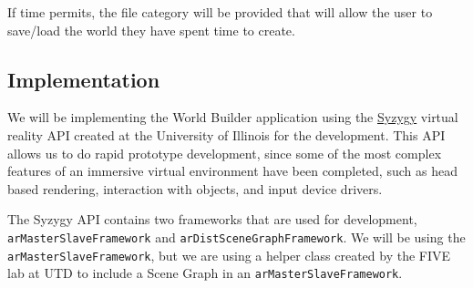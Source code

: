 If time permits, the file category will be provided that will allow the user to save/load the world they have spent time to create.

\subsection{Implementation}
We will be implementing the World Builder application using the \href{http://syzygy.isl.uiuc.edu/szg/szgsrc/doc/index.html}{Syzygy} virtual reality API created at the University of Illinois for the development.
This API allows us to do rapid prototype development, since some of the most complex features of an immersive virtual environment have been completed, such as head based rendering, interaction with objects, and input device drivers.

The Syzygy API contains two frameworks that are used for development, \verb|arMasterSlaveFramework| and \verb|arDistSceneGraphFramework|.
We will be using the \verb|arMasterSlaveFramework|, but we are using a helper class created by the FIVE lab at UTD to include a Scene Graph in an \verb|arMasterSlaveFramework|.
